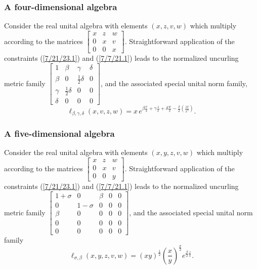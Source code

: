 \documentclass{amsart}
\numberwithin{equation}{section}
\theoremstyle{definition}
\numberwithin{theorem}{section}
\begin{document}
 \subsubsection{A four-dimensional algebra} Consider the real unital algebra with elements 
$(x,z,v,w)$ which multiply according to the matrices 
$\left[
\begin{array}{ccccc}
x & z & w   \\
0 & x & v \\
0 & 0 & x  
\end{array}
\right]$.
Straightforward application of the constraints (\ref{7/21/23.1}) and (\ref{7/7/21.1}) leads to the normalized uncurling metric family 
$\left[
\begin{array}{cccc}
1 & \beta & \gamma & \delta   \\
\beta & 0 & \frac{1}{2}\delta & 0 \\
\gamma & \frac{1}{2}\delta &  0 & 0   \\
\delta & 0 &  0 & 0
\end{array}
\right]$, and the associated special unital norm family,
\[ \ell_{\beta,\gamma,\delta}(x,v,z,w) = x\, e^{\beta\frac{v}{x} + \gamma\frac{z}{x} +\delta\frac{w}{x}- \frac{\delta}{2}\left(\frac{zv}{x^2}\right)}.\]


\subsubsection{A five-dimensional algebra}Consider the real unital algebra with elements 
$(x,y,z,v,w)$ which multiply according to the matrices
$\left[
\begin{array}{ccccc}
x & z & w   \\
0 & x & v \\
0 & 0 & y  
\end{array}
\right]$.
Straightforward application of the constraints (\ref{7/21/23.1}) and (\ref{7/7/21.1}) leads to the normalized uncurling metric family 
$\left[
\begin{array}{ccccc}
1+\sigma & 0 & \beta & 0  & 0   \\
0 & 1-\sigma & 0 & 0 & 0 \\
\beta & 0 &  0 & 0 & 0  \\
 0 & 0 &  0 & 0 & 0  \\
0 & 0 &  0 & 0 & 0
\end{array}
\right]$, and the associated special unital norm family 
\[ \ell_{\sigma,\beta}(x,y,z,v,w) =  (xy)^{\frac{1}{2}}\left(\frac{x}{y}\right)^{\frac{\sigma}{2}} e^{\frac{\beta}{2} \frac{z}{x}}.\]
\end{document}
